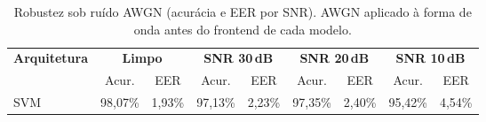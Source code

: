 \begin{table}[H]
\centering
\caption{Robustez sob ruído AWGN (acurácia e EER por SNR). AWGN aplicado à forma de onda antes do frontend de cada modelo.}
\label{tab:bench_robustez}
\small\singlespacing
\begin{tabular}{lcccccccc}
\toprule
\multirow{2}{*}{\textbf{Arquitetura}} & \multicolumn{2}{c}{\textbf{Limpo}} & \multicolumn{2}{c}{\textbf{SNR 30\,dB}} & \multicolumn{2}{c}{\textbf{SNR 20\,dB}} & \multicolumn{2}{c}{\textbf{SNR 10\,dB}} \\
\cmidrule(lr){2-3}\cmidrule(lr){4-5}\cmidrule(lr){6-7}\cmidrule(lr){8-9}
 & Acur. & EER & Acur. & EER & Acur. & EER & Acur. & EER \\
\midrule
SVM & 98,07\% & 1,93\% & 97,13\% & 2,23\% & 97,35\% & 2,40\% & 95,42\% & 4,54\% \\
\bottomrule
\end{tabular}
\end{table}
